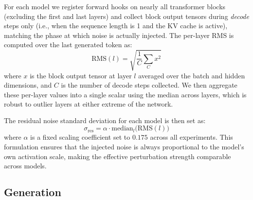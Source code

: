 \documentclass[11pt]{article}
\begin{document}
For each model we register forward hooks on nearly all transformer blocks (excluding the first and last layers) and collect block output tensors during \textit{decode} steps only (i.e., when the sequence length is 1 and the KV cache is active), matching the phase at which noise is actually injected. The per-layer RMS is computed over the last generated token as:
\begin{equation}
    \mathrm{RMS}(l) = \sqrt{\frac{1}{C} \sum_{C} x^2}
\end{equation}
where $x$ is the block output tensor at layer $l$ averaged over the batch and hidden dimensions, and $C$ is the number of decode steps collected. We then aggregate these per-layer values into a single scalar using the median across layers, which is robust to outlier layers at either extreme of the network.

The residual noise standard deviation for each model is then set as:
\begin{equation}
    \sigma_{\mathrm{res}} = \alpha \cdot \mathrm{median}_l\bigl(\mathrm{RMS}(l)\bigr)
\end{equation}
where $\alpha$ is a fixed scaling coefficient set to $0.175$ across all experiments. This formulation ensures that the injected noise is always proportional to the model's own activation scale, making the effective perturbation strength comparable across models.

\subsection{Generation}
\label{sec:storygeneration}


\end{document}
